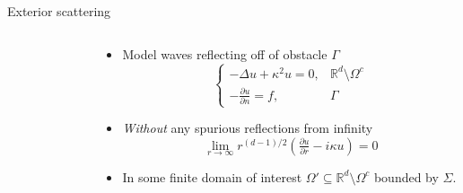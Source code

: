 \documentclass{beamer}
\begin{document}
\begin{frame}{Exterior scattering}
    \begin{columns}
    \begin{column}{0.45\textwidth}
        \begin{figure}[ht]
        \begin{center}
        \end{center}\label{fig:2ddomain}
        \end{figure}
    \end{column}
    \begin{column}{0.55\textwidth}
        \begin{itemize}
            \item<1-> Model waves reflecting off of obstacle $\Gamma$
            \[
                \begin{cases}
                    -\Delta u + \kappa^2 u = 0, &  \mathbb R^d\setminus\Omega^c \\
                    -\frac{\partial u}{\partial n} = f, & \Gamma
                \end{cases}
            \]
            \item<2-> \emph{Without} any spurious reflections from infinity
            \[
                \lim_{r\to\infty} r^{(d-1)/2}
                    \left(\tfrac{\partial u}{\partial r} - i\kappa u\right)
                = 0
            \]
            \item<3-> In some finite domain of interest 
            $\Omega'\subseteq \mathbb R^d\setminus\Omega^c$
            bounded by $\Sigma$.
        \end{itemize}
    \end{column}
\end{columns}
\end{frame}
\end{document}
